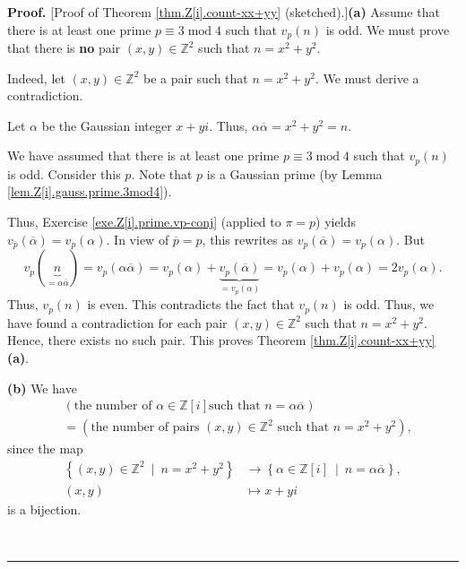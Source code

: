 \documentclass[numbers=enddot,12pt,final,onecolumn,notitlepage]{scrartcl}%
\numberwithin{exer}{subsection}
\theoremstyle{definition}
\newenvironment{proof}[1][Proof]{\noindent\textbf{#1.} }{\ \rule{0.5em}{0.5em}}
\begin{document}
\begin{proof}
[Proof of Theorem \ref{thm.Z[i].count-xx+yy} (sketched).]\textbf{(a)} Assume
that there is at least one prime $p\equiv3\operatorname{mod}4$ such that
$v_{p}\left(  n\right)  $ is odd. We must prove that there is \textbf{no} pair
$\left(  x,y\right)  \in\mathbb{Z}^{2}$ such that $n=x^{2}+y^{2}$.

Indeed, let $\left(  x,y\right)  \in\mathbb{Z}^{2}$ be a pair such that
$n=x^{2}+y^{2}$. We must derive a contradiction.

Let $\alpha$ be the Gaussian integer $x+yi$. Thus, $\alpha\overline{\alpha
}=x^{2}+y^{2}=n$.

We have assumed that there is at least one prime $p\equiv3\operatorname{mod}4$
such that $v_{p}\left(  n\right)  $ is odd. Consider this $p$. Note that $p$
is a Gaussian prime (by Lemma \ref{lem.Z[i].gauss.prime.3mod4}).

Thus, Exercise \ref{exe.Z[i].prime.vp-conj} (applied to $\pi=p$) yields
$v_{\overline{p}}\left(  \overline{\alpha}\right)  =v_{p}\left(
\alpha\right)  $. In view of $\overline{p}=p$, this rewrites as $v_{p}\left(
\overline{\alpha}\right)  =v_{p}\left(  \alpha\right)  $. But
\[
v_{p}\left(  \underbrace{n}_{=\alpha\overline{\alpha}}\right)  =v_{p}\left(
\alpha\overline{\alpha}\right)  =v_{p}\left(  \alpha\right)
+\underbrace{v_{p}\left(  \overline{\alpha}\right)  }_{=v_{p}\left(
\alpha\right)  }=v_{p}\left(  \alpha\right)  +v_{p}\left(  \alpha\right)
=2v_{p}\left(  \alpha\right)  .
\]
Thus, $v_{p}\left(  n\right)  $ is even. This contradicts the fact that
$v_{p}\left(  n\right)  $ is odd. Thus, we have found a contradiction for each
pair $\left(  x,y\right)  \in\mathbb{Z}^{2}$ such that $n=x^{2}+y^{2}$. Hence,
there exists no such pair. This proves Theorem \ref{thm.Z[i].count-xx+yy}
\textbf{(a)}.

\textbf{(b)} We have%
\begin{align*}
&  \left(  \text{the number of }\alpha\in\mathbb{Z}\left[  i\right]  \text{
such that }n=\alpha\overline{\alpha}\right) \\
&  =\left(  \text{the number of pairs }\left(  x,y\right)  \in\mathbb{Z}%
^{2}\text{ such that }n=x^{2}+y^{2}\right)  ,
\end{align*}
since the map%
\begin{align*}
\left\{  \left(  x,y\right)  \in\mathbb{Z}^{2}\ \mid\ n=x^{2}+y^{2}\right\}
&  \rightarrow\left\{  \alpha\in\mathbb{Z}\left[  i\right]  \ \mid
\ n=\alpha\overline{\alpha}\right\}  ,\\
\left(  x,y\right)   &  \mapsto x+yi
\end{align*}
is a bijection.


\end{proof}
\end{document}
